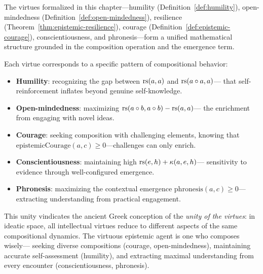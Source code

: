 \begin{interpretation}
The virtues formalized in this chapter---humility (Definition~\ref{def:humility}),
open-mindedness (Definition~\ref{def:open-mindedness}), resilience
(Theorem~\ref{thm:epistemic-resilience}), courage (Definition~\ref{def:epistemic-courage}),
conscientiousness, and phronesis---form a unified mathematical structure grounded
in the composition operation and the emergence term.

Each virtue corresponds to a specific pattern of compositional behavior:
\begin{itemize}
\item \textbf{Humility}: recognizing the gap between $\mathrm{rs}(a, a)$ and $\mathrm{rs}(a \circ a, a)$---
  that self-reinforcement inflates beyond genuine self-knowledge.
\item \textbf{Open-mindedness}: maximizing $\mathrm{rs}(a \circ b, a \circ b) - \mathrm{rs}(a, a)$---
  the enrichment from engaging with novel ideas.
\item \textbf{Courage}: seeking composition with challenging elements, knowing that
  $\mathrm{epistemicCourage}(a, c) \geq 0$---challenges can only enrich.
\item \textbf{Conscientiousness}: maintaining high $\mathrm{rs}(e, h) + \kappa(a, e, h)$---
  sensitivity to evidence through well-configured emergence.
\item \textbf{Phronesis}: maximizing the contextual emergence $\mathrm{phronesis}(a, c) \geq 0$---
  extracting understanding from practical engagement.
\end{itemize}

This unity vindicates the ancient Greek conception of the \emph{unity of the virtues}:
in ideatic space, all intellectual virtues reduce to different aspects of the same
compositional dynamics. The virtuous epistemic agent is one who composes wisely---
seeking diverse compositions (courage, open-mindedness), maintaining accurate
self-assessment (humility), and extracting maximal understanding from every
encounter (conscientiousness, phronesis).
\end{interpretation}

